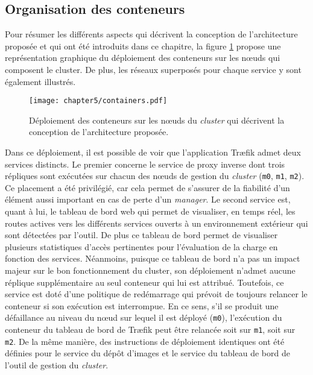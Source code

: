\subsection{Organisation des conteneurs}
\label{sec:cont_org}

Pour résumer les différents aspects qui décrivent la conception de l'architecture proposée et qui ont été introduits dans ce chapitre, la figure \ref{fig:containers} propose une représentation graphique du déploiement des conteneurs sur les n\oe{}uds qui composent le cluster. De plus, les réseaux superposés pour chaque service y sont également illustrés.

\begin{figure}[H]
	\centering
	\texttt{[image: chapter5/containers.pdf]}
        \caption{Déploiement des conteneurs sur les n\oe{}uds du \textit{cluster} qui décrivent la conception de l'architecture proposée.}
	\label{fig:containers}
\end{figure}

Dans ce déploiement, il est possible de voir que l'application Tr\ae{}fik admet deux services distincts. Le premier concerne le service de proxy inverse dont trois répliques sont exécutées sur chacun des n\oe{}uds de gestion du \textit{cluster} (\texttt{m0}, \texttt{m1}, \texttt{m2}). Ce placement a été privilégié, car cela permet de s'assurer de la fiabilité d'un élément aussi important en cas de perte d'un \textit{manager}. Le second service est, quant à lui, le tableau de bord web qui permet de visualiser, en temps réel, les routes actives vers les différents services ouverts à un environnement extérieur qui sont détectées par l'outil. De plus ce tableau de bord permet de visualiser plusieurs statistiques d'accès pertinentes pour l'évaluation de la charge en fonction des services. Néanmoins, puisque ce tableau de bord n'a pas un impact majeur sur le bon fonctionnement du cluster, son déploiement n'admet aucune réplique supplémentaire au seul conteneur qui lui est attribué. Toutefois, ce service est doté d'une politique de redémarrage qui prévoit de toujours relancer le conteneur si son exécution est interrompue. En ce sens, s'il se produit une défaillance au niveau du n\oe{}ud sur lequel il est déployé (\texttt{m0}), l'exécution du conteneur du tableau de bord de Tr\ae{}fik peut être relancée soit sur \texttt{m1}, soit sur \texttt{m2}. De la même manière, des instructions de déploiement identiques ont été définies pour le service du dépôt d'images et le service du tableau de bord de l'outil de gestion du \textit{cluster}.

